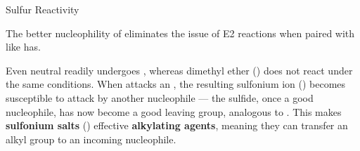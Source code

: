 \documentclass[10pt]{article}
\begin{document}
  \begin{core}{Sulfur Reactivity}
    
    The better nucleophility of  eliminates the issue of E2 reactions when paired with  like  has.

 
    Even neutral  readily undergoes \snt, whereas dimethyl ether () does not react under the same conditions. When  attacks an , the resulting sulfonium ion () becomes susceptible to attack by another nucleophile — the sulfide, once a good nucleophile, has now become a good leaving group, analogous to . This makes \textbf{sulfonium salts} () effective \textbf{alkylating agents}, meaning they can transfer an alkyl group to an incoming nucleophile.


\end{core}
\end{document}
